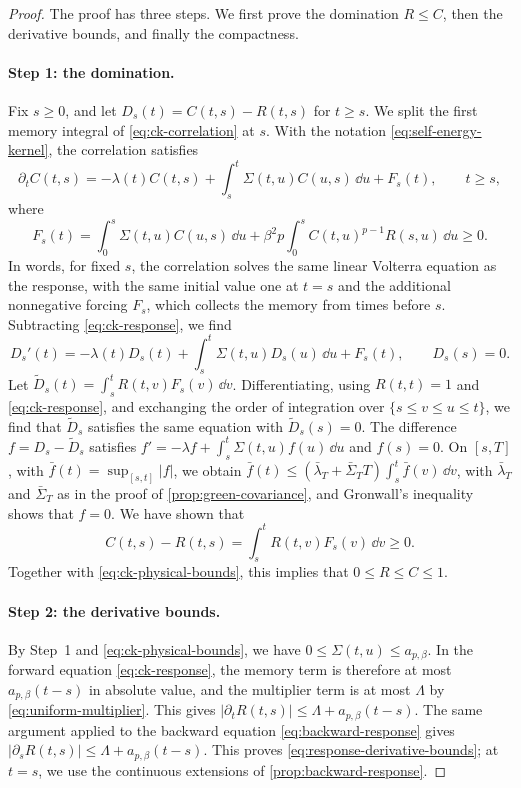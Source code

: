 \begin{proof}
The proof has three steps. We first prove the domination $R\le C$, then the derivative bounds, and finally the compactness.

\paragraph{Step 1: the domination.}
Fix $s\ge0$, and let $D_s(t)=C(t,s)-R(t,s)$ for $t\ge s$. We split the first memory integral of \eqref{eq:ck-correlation} at $s$. With the notation \eqref{eq:self-energy-kernel}, the correlation satisfies
\[
 \partial_tC(t,s)=-\lambda(t)C(t,s)+\int_s^t\Sigma(t,u)C(u,s)\,\dd u+F_s(t),\qquad t\ge s,
\]
where
\[
 F_s(t)=\int_0^s\Sigma(t,u)C(u,s)\,\dd u+\beta^2p\int_0^s C(t,u)^{p-1}R(s,u)\,\dd u\ge0.
\]
In words, for fixed $s$, the correlation solves the same linear Volterra equation as the response, with the same initial value one at $t=s$ and the additional nonnegative forcing $F_s$, which collects the memory from times before $s$. Subtracting \eqref{eq:ck-response}, we find
\[
 D_s'(t)=-\lambda(t)D_s(t)+\int_s^t\Sigma(t,u)D_s(u)\,\dd u+F_s(t),\qquad D_s(s)=0.
\]
Let $\tilde D_s(t)=\int_s^tR(t,v)F_s(v)\,\dd v$. Differentiating, using $R(t,t)=1$ and \eqref{eq:ck-response}, and exchanging the order of integration over $\{s\le v\le u\le t\}$, we find that $\tilde D_s$ satisfies the same equation with $\tilde D_s(s)=0$. The difference $f=D_s-\tilde D_s$ satisfies $f'=-\lambda f+\int_s^t\Sigma(t,u)f(u)\,\dd u$ and $f(s)=0$. On $[s,T]$, with $\bar f(t)=\sup_{[s,t]}|f|$, we obtain $\bar f(t)\le(\bar\lambda_T+\bar\Sigma_TT)\int_s^t\bar f(v)\,\dd v$, with $\bar\lambda_T$ and $\bar\Sigma_T$ as in the proof of \cref{prop:green-covariance}, and Gronwall's inequality shows that $f=0$. We have shown that
\[
 C(t,s)-R(t,s)=\int_s^tR(t,v)F_s(v)\,\dd v\ge0.
\]
Together with \eqref{eq:ck-physical-bounds}, this implies that $0\le R\le C\le1$.

\paragraph{Step 2: the derivative bounds.}
By Step~1 and \eqref{eq:ck-physical-bounds}, we have $0\le\Sigma(t,u)\le a_{p,\beta}$. In the forward equation \eqref{eq:ck-response}, the memory term is therefore at most $a_{p,\beta}(t-s)$ in absolute value, and the multiplier term is at most $\Lambda$ by \eqref{eq:uniform-multiplier}. This gives $|\partial_tR(t,s)|\le\Lambda+a_{p,\beta}(t-s)$. The same argument applied to the backward equation \eqref{eq:backward-response} gives $|\partial_sR(t,s)|\le\Lambda+a_{p,\beta}(t-s)$. This proves \eqref{eq:response-derivative-bounds}; at $t=s$, we use the continuous extensions of \cref{prop:backward-response}.


\end{proof}
